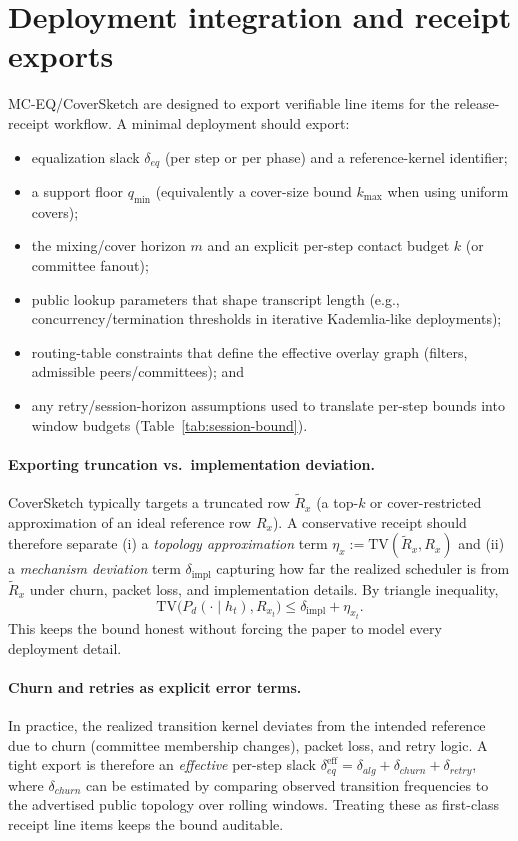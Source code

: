 \documentclass[11pt]{article}
\newcommand{\TV}{\mathrm{TV}}
\begin{document}
\section{Deployment integration and receipt exports}
\label{sec:deploy}
MC-EQ/CoverSketch are designed to export verifiable line items for the release-receipt workflow.\cite{series:release}
A minimal deployment should export:
\begin{itemize}[leftmargin=1.3em]
\item equalization slack $\delta_{eq}$ (per step or per phase) and a reference-kernel identifier;
\item a support floor $q_{\min}$ (equivalently a cover-size bound $k_{\max}$ when using uniform covers);
\item the mixing/cover horizon $m$ and an explicit per-step contact budget $k$ (or committee fanout);
\item public lookup parameters that shape transcript length (e.g., concurrency/termination thresholds in iterative Kademlia-like deployments);
\item routing-table constraints that define the effective overlay graph (filters, admissible peers/committees); and
\item any retry/session-horizon assumptions used to translate per-step bounds into window budgets (Table~\ref{tab:session-bound}).
\end{itemize}

\paragraph{Exporting truncation vs.\ implementation deviation.}
CoverSketch typically targets a truncated row $\widetilde R_x$ (a top-$k$ or cover-restricted approximation of an ideal reference row $R_x$).
A conservative receipt should therefore separate
(i) a \emph{topology approximation} term $\eta_x:=\TV(\widetilde R_x,R_x)$ and
(ii) a \emph{mechanism deviation} term $\delta_{\mathrm{impl}}$ capturing how far the realized scheduler is from $\widetilde R_x$ under churn, packet loss, and implementation details.
By triangle inequality,
\[
\TV\big(P_d(\cdot\mid h_t),R_{x_t}\big)\le \delta_{\mathrm{impl}} + \eta_{x_t}.
\]
This keeps the bound honest without forcing the paper to model every deployment detail.

\paragraph{Churn and retries as explicit error terms.}
In practice, the realized transition kernel deviates from the intended reference due to churn (committee membership changes), packet loss, and retry logic.
A tight export is therefore an \emph{effective} per-step slack
$\delta_{eq}^{\mathrm{eff}}=\delta_{alg}+\delta_{churn}+\delta_{retry}$,
where $\delta_{churn}$ can be estimated by comparing observed transition frequencies to the advertised public topology over rolling windows.
Treating these as first-class receipt line items keeps the bound auditable.
\end{document}
